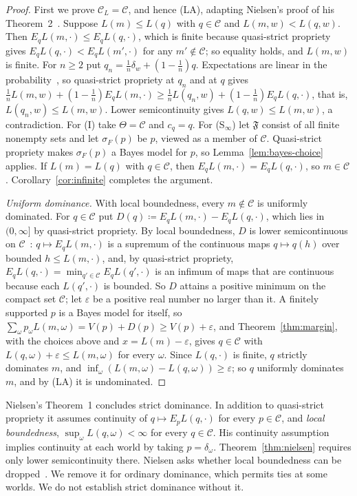 \documentclass[11pt]{article}
\theoremstyle{definition}
\theoremstyle{remark}
\newcommand{\C}{\mathcal C}
\newcommand{\F}{\mathfrak F}
\begin{document}
\begin{proof}


First we prove $\C_L=\C$, and hence (LA), adapting Nielsen's proof of his Theorem~2~\cite{Nielsen}. Suppose $L(m)\le L(q)$ with $q\in\C$ and $L(m,w)<L(q,w)$. Then $E_qL(m,\cdot)\le E_qL(q,\cdot)$, which is finite because quasi-strict propriety gives $E_qL(q,\cdot)<E_qL(m',\cdot)$ for any $m'\notin\C$; so equality holds, and $L(m,w)$ is finite. For $n\ge2$ put $q_n=\frac1n\delta_w+(1-\frac1n)q$. Expectations are linear in the probability~\cite[Appendix~A, Proposition~1]{Nielsen}, so quasi-strict propriety at $q_n$ and at $q$ gives $\frac1nL(m,w)+(1-\frac1n)E_qL(m,\cdot)\ge\frac1nL(q_n,w)+(1-\frac1n)E_qL(q,\cdot)$, that is, $L(q_n,w)\le L(m,w)$. Lower semicontinuity gives $L(q,w)\le L(m,w)$, a contradiction. For (I) take $\Theta=\C$ and $c_q=q$. For (S$_\infty$) let $\F$ consist of all finite nonempty sets and let $\sigma_F(p)$ be $p$, viewed as a member of $\C$. Quasi-strict propriety makes $\sigma_F(p)$ a Bayes model for $p$, so Lemma~\ref{lem:bayes-choice} applies. If $L(m)=L(q)$ with $q\in\C$, then $E_qL(m,\cdot)=E_qL(q,\cdot)$, so $m\in\C$. Corollary~\ref{cor:infinite} completes the argument.

\emph{Uniform dominance.} With local boundedness, every $m\notin\C$ is uniformly dominated. For $q\in\C$ put $D(q)\coloneqq E_qL(m,\cdot)-E_qL(q,\cdot)$, which lies in $(0,\infty]$ by quasi-strict propriety. By local boundedness, $D$ is lower semicontinuous on $\C$~\cite[Lemma~3]{Nielsen}: $q\mapsto E_qL(m,\cdot)$ is a supremum of the continuous maps $q\mapsto q(h)$ over bounded $h\le L(m,\cdot)$, and, by quasi-strict propriety, $E_qL(q,\cdot)=\min_{q'\in\C}E_qL(q',\cdot)$ is an infimum of maps that are continuous~\cite[Lemma~1]{Nielsen} because each $L(q',\cdot)$ is bounded. So $D$ attains a positive minimum on the compact set $\C$; let $\varepsilon$ be a positive real number no larger than it. A finitely supported $p$ is a Bayes model for itself, so $\sum_\omega p_\omega L(m,\omega)=V(p)+D(p)\ge V(p)+\varepsilon$, and Theorem~\ref{thm:margin}, with the choices above and $x=L(m)-\varepsilon$, gives $q\in\C$ with $L(q,\omega)+\varepsilon\le L(m,\omega)$ for every $\omega$. Since $L(q,\cdot)$ is finite, $q$ strictly dominates $m$, and $\inf_\omega(L(m,\omega)-L(q,\omega))\ge\varepsilon$; so $q$ uniformly dominates $m$, and by (LA) it is undominated.
\end{proof}

Nielsen's Theorem~1 concludes strict dominance. In addition to quasi-strict propriety it assumes continuity of $q\mapsto E_pL(q,\cdot)$ for every $p\in\C$, and \emph{local boundedness}, $\sup_\omega L(q,\omega)<\infty$ for every $q\in\C$. His continuity assumption implies continuity at each world by taking $p=\delta_\omega$. Theorem~\ref{thm:nielsen} requires only lower semicontinuity there. Nielsen asks whether local boundedness can be dropped~\cite[\S4.2.1]{Nielsen}. We remove it for ordinary dominance, which permits ties at some worlds. We do not establish strict dominance without it.
\end{document}
